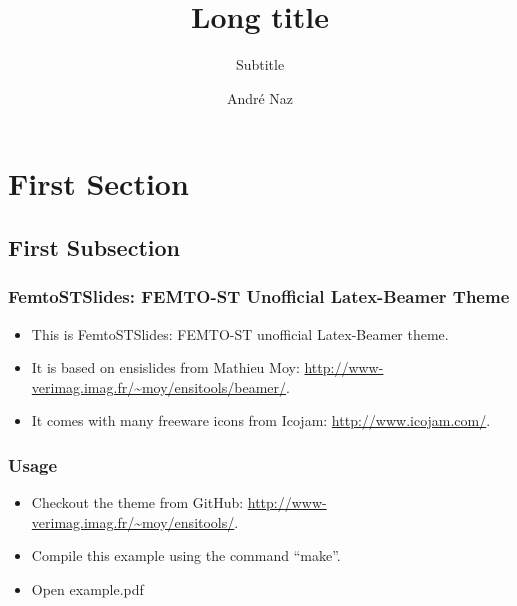 \documentclass{beamer}
\title[Short title]{Long title}
\subtitle{Subtitle} %
\author{André Naz}
\institute{Femto-st}
\begin{document}
\begin{frame}
  \titlepage
\end{frame}

\section{First Section}

\subsection{First Subsection}

\begin{frame} \frametitle{FemtoSTSlides: FEMTO-ST Unofficial Latex-Beamer Theme}
  
  \begin{itemize}
  \item This is FemtoSTSlides: FEMTO-ST unofficial Latex-Beamer theme.
  \item It is based on ensislides from Mathieu Moy: \url{http://www-verimag.imag.fr/~moy/ensitools/beamer/}.
  \item It comes with many freeware icons from Icojam: \url{http://www.icojam.com/}. 
  \pause
  \end{itemize}

\end{frame}

\begin{frame} \frametitle{Usage}
  
  \begin{itemize}
  \item Checkout the theme from GitHub: \url{http://www-verimag.imag.fr/~moy/ensitools/}.
  \item Compile this example using the command ``make''.
  \item Open example.pdf
  \end{itemize}
\end{frame}
\end{document}
